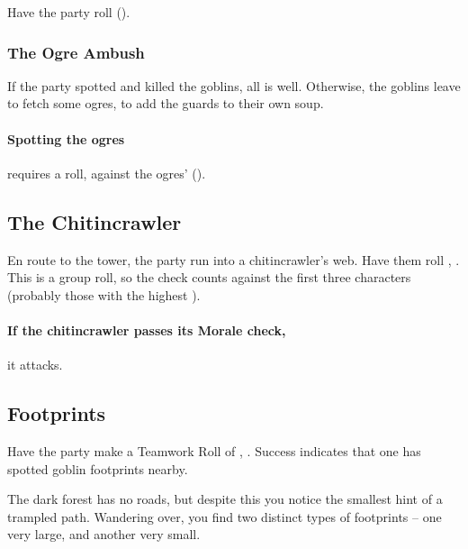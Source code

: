 \begin{multicols}{2}
Have the party roll  (\tn[10]).

\subsubsection{The Ogre Ambush}

If the party spotted and killed the goblins, all is well.
Otherwise, the goblins leave to fetch some ogres, to add the guards to their own soup.

\ogre

\paragraph{Spotting the ogres}
requires a  roll, against the ogres'  (\tn).

\subsection{The Chitincrawler}

En route to the tower, the party run into a chitincrawler's web.
Have them roll , \tn[10].
This is a group roll, so the check counts against the first three characters (probably those with the highest ).

\chitincrawler

\paragraph{If the chitincrawler passes its Morale check,}
it attacks.%

\subsection{Footprints}

Have the party make a Teamwork Roll of , \tn[10].
Success indicates that one has spotted goblin footprints nearby.

\begin{boxtext}

  The dark forest has no roads, but despite this you notice the smallest hint of a trampled path.
  Wandering over, you find two distinct types of footprints -- one very large, and another very small.

\end{boxtext}


\end{multicols}

